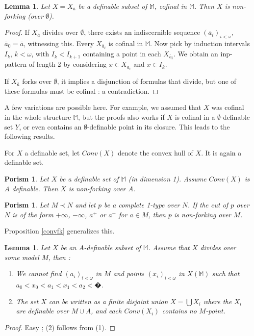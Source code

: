 \documentclass[english]{article}
\newtheorem{lemme}[thm]{Lemma}
\newtheorem{por}[thm]{Porism}
\theoremstyle{definition}
\theoremstyle{mystyle}
\theoremstyle{remark}
\newcommand{\MM}{\mathbb M}
\begin{document}
\begin{lemme}\label{fork}
Let $X=X_{\bar a}$ be a definable subset of $\MM$, cofinal in $\MM$. Then $X$ is non-forking (over $\emptyset$).
\end{lemme}
\begin{proof}
If $X_{\bar a}$ divides over $\emptyset$, there exists an indiscernible sequence $(\bar a_i)_{i < \omega}$, $\bar a_0 = \bar a$, witnessing this. Every $X_{\bar a_i}$ is cofinal in $\MM$. Now pick by induction intervals $I_k$, $k<\omega$, with $I_k < I_{k+1}$ containing a point in each $X_{\bar a_i}$.
We obtain an inp-pattern of length 2 by considering $x \in X_{\bar a_i}$ and $x \in I_k$.

If $X_{\bar a}$ forks over $\emptyset$, it implies a disjunction of formulas that divide, but one of these formulas must be cofinal : a contradiction.
\end{proof}

A few variations are possible here. For example, we assumed that $X$ was cofinal in the whole structure $\MM$, but the proofs also works if $X$ is cofinal in a $\emptyset$-definable set $Y$, or even contains an $\emptyset$-definable point in its closure. This leads to the following results.

For $X$ a definable set, let $Conv(X)$ denote the convex hull of $X$. It is again a definable set.
\begin{por}
Let $X$ be a definable set of $\MM$ (in dimension 1). Assume $Conv(X)$ is $A$ definable. Then $X$ is non-forking over $A$.
\end{por}

\begin{por}
Let $M \prec N$ and let $p$ be a complete 1-type over $N$. If the cut of $p$ over $N$ is of the form $+\infty$, $-\infty$, $a^+$ or $a^-$ for $a \in M$, then $p$ is non-forking over $M$.
\end{por}

Proposition \ref{convfk} generalizes this.


\begin{lemme}
Let $X$ be an $A$-definable subset of $\MM$. Assume that $X$ divides over some model $M$, then : \begin{enumerate}
\item We cannot find $(a_i)_{i<\omega}$ in $M$ and points $(x_i)_{i<\omega}$ in $X(\MM)$ such that $a_0 < x_0 < a_1 < x_1 < a_2 < �$.

\item The set $X$ can be written as a finite disjoint union $X = \bigcup X_i$ where the $X_i$ are definable over $M\cup A$, and each $Conv(X_i)$ contains no $M$-point.
\end{enumerate}
\end{lemme}
\begin{proof}
Easy ; (2) follows from (1).
\end{proof}
\end{document}
